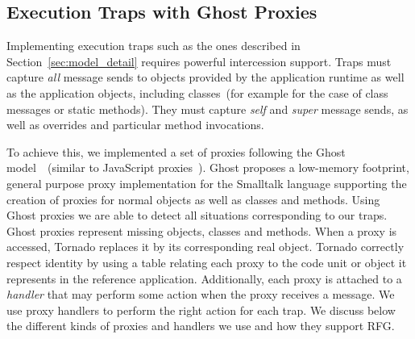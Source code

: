 \subsection{Execution Traps with Ghost Proxies} \label{sec:proxies}

Implementing execution traps such as the ones described in Section~\ref{sec:model_detail} requires powerful intercession support. Traps must capture \emph{all} message sends to objects provided by the application runtime as well as the application objects, including classes~(for example for the case of class messages or static methods). They must capture \emph{self} and \emph{super} message sends, as well as overrides and particular method invocations.

To achieve this, we implemented a set of proxies following the Ghost model~\cite{Mart11a}~(similar to JavaScript proxies~\cite{Vanc10a}). Ghost proposes a low-memory footprint, general purpose proxy implementation for the Smalltalk language supporting the creation of proxies for normal objects as well as classes and methods. 
Using Ghost proxies we are able to detect all situations corresponding to our traps.
Ghost proxies represent missing objects, classes and methods. When a proxy is accessed, Tornado replaces it by its corresponding real object.
Tornado correctly respect identity by using a table relating each proxy to the code unit or object it represents in the reference application.
Additionally, each proxy is attached to a \emph{handler} that may perform some action when the proxy receives a message.
We use proxy handlers to perform the right action for each trap.
We discuss below the different kinds of proxies and handlers we use and how they support RFG.

